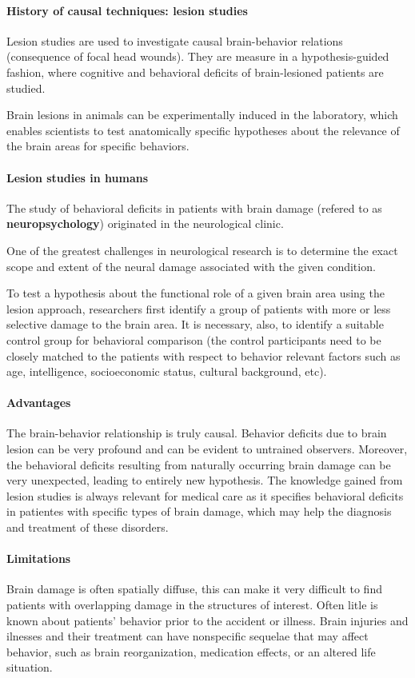 \documentclass[12pt,article,oneside,a4paper]{memoir}
\begin{document}
\paragraph{History of causal techniques: lesion studies }
Lesion studies are used to investigate causal brain-behavior relations
(consequence of focal head wounds). They are measure in a hypothesis-guided
fashion, where cognitive and behavioral deficits of brain-lesioned patients
are studied.

Brain lesions in animals can be experimentally induced in the laboratory, which
enables scientists to test anatomically specific hypotheses about the relevance
of the brain areas for specific behaviors.

\paragraph{Lesion studies in humans}
The study of behavioral deficits in patients with brain damage (refered to as \textbf{neuropsychology}) originated in the neurological clinic.

One of the greatest challenges in neurological research is to determine the
exact scope and extent of the neural damage associated with the given
condition.

To test a hypothesis about the functional role of a given brain area using the
lesion approach, researchers first identify a group of patients with more or
less selective damage to the brain area. It is necessary, also, to identify a
suitable control group for behavioral comparison (the control participants need
to be closely matched to the patients with respect to behavior relevant factors
such as age, intelligence, socioeconomic status, cultural background, etc).

\paragraph{Advantages}
The brain-behavior relationship is truly causal. Behavior deficits due to brain
lesion can be very profound and can be evident to untrained observers.
Moreover, the behavioral deficits resulting from naturally occurring brain
damage can be very unexpected, leading to entirely new hypothesis. The
knowledge gained from lesion studies is always relevant for medical care as it
specifies behavioral deficits in patientes with specific types of brain damage,
which may help the diagnosis and treatment of these disorders.

\paragraph{Limitations}
Brain damage is often spatially diffuse, this can make it very difficult to
find patients with overlapping damage in the structures of interest. Often
litle is known about patients' behavior prior to the accident or illness. Brain
injuries and ilnesses and their treatment can have nonspecific sequelae that
may affect behavior, such as brain reorganization, medication effects, or an
altered life situation.
\end{document}
